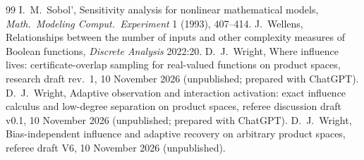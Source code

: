 \documentclass[11pt]{article}
\numberwithin{equation}{section}
\theoremstyle{definition}
\theoremstyle{remark}
\newcommand{\1}{\mathbf 1}
\begin{document}
\begin{thebibliography}{99}
 I.~M.~Sobol', Sensitivity analysis for nonlinear mathematical models, \emph{Math.\ Modeling Comput.\ Experiment} 1 (1993), 407--414.
 J.~Wellens, Relationships between the number of inputs and other complexity measures of Boolean functions, \emph{Discrete Analysis} 2022:20.
 D.~J.~Wright, Where influence lives: certificate-overlap sampling for real-valued functions on product spaces, research draft rev.~1, 10 November 2026 (unpublished; prepared with ChatGPT).
 D.~J.~Wright, Adaptive observation and interaction activation: exact influence calculus and low-degree separation on product spaces, referee discussion draft v0.1, 10 November 2026 (unpublished; prepared with ChatGPT).
 D.~J.~Wright, Bias-independent influence and adaptive recovery on arbitrary product spaces, referee draft V6, 10 November 2026 (unpublished).
\end{thebibliography}
\end{document}
